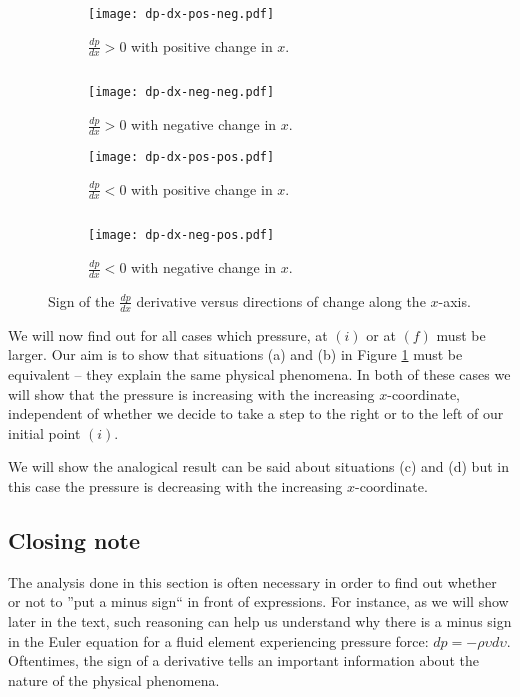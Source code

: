 \begin{figure}[H]
\begin{subfigure}[t]{.46\textwidth}
\centering
\texttt{[image: dp-dx-pos-neg.pdf]}
\caption{$\frac{dp}{dx} > 0$ with positive change in $x$.}
\end{subfigure}
\begin{minipage}[t]{.07\textwidth}
$ $
\vspace*{1.5cm}
\end{minipage}
\begin{subfigure}[t]{.46\textwidth}
\centering
\texttt{[image: dp-dx-neg-neg.pdf]}
\caption{$\frac{dp}{dx} > 0$ with negative change in $x$.}
\end{subfigure}
\begin{subfigure}[t]{.46\textwidth}
\centering
\texttt{[image: dp-dx-pos-pos.pdf]}
\caption{$\frac{dp}{dx} < 0$ with positive change in $x$.}
\end{subfigure}
\begin{minipage}[t]{.08\textwidth}
$ $
\end{minipage}
\begin{subfigure}[t]{.46\textwidth}
\centering
\texttt{[image: dp-dx-neg-pos.pdf]}
\caption{$\frac{dp}{dx} < 0$ with negative change in $x$.}
\end{subfigure}
\caption{Sign of the $\frac{dp}{dx}$ derivative versus directions of change along the $x$-axis.}
\label{fig:dp-dx-signs}
\end{figure}

We will now find out for all cases which pressure, at \textcolor{myblue}{$(i)$} or at \textcolor{myblue}{$(f)$} must be larger. Our aim is to show that situations (a) and (b) in Figure \ref{fig:dp-dx-signs} must be equivalent -- they explain the same physical phenomena. In both of these cases we will show that the pressure is increasing with the increasing $x$-coordinate, independent of whether we decide to take a step to the right or to the left of our initial point \textcolor{myblue}{$(i)$}. 

We will show the analogical result can be said about situations (c) and (d) but in this case the pressure is decreasing with the increasing $x$-coordinate.



\subsection{Closing note}

The analysis done in this section is often necessary in order to find out whether or not to ''put a minus sign`` in front of expressions. For instance, as we will show later in the text, such reasoning can help us understand why there is a minus sign in the Euler equation for a fluid element experiencing pressure force: $dp = - \rho \upsilon d \upsilon$. Oftentimes, the sign of a derivative tells an important information about the nature of the physical phenomena.





